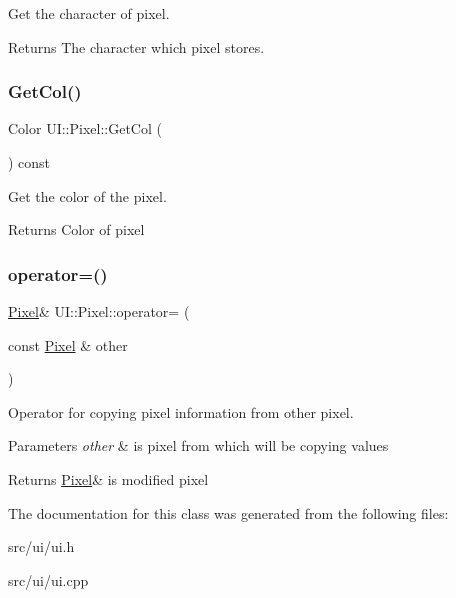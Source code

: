 Get the character of pixel. 

\begin{DoxyReturn}{Returns}
The character which pixel stores. 
\end{DoxyReturn}
\mbox{\label{classUI_1_1Pixel_a0068bdfb2e0a853ec511df3422d17a37}} 
\subsubsection{\texorpdfstring{Get\+Col()}{GetCol()}}
{\footnotesize\ttfamily Color U\+I\+::\+Pixel\+::\+Get\+Col (\begin{DoxyParamCaption}{ }\end{DoxyParamCaption}) const}



Get the color of the pixel. 

\begin{DoxyReturn}{Returns}
Color of pixel 
\end{DoxyReturn}
\mbox{\label{classUI_1_1Pixel_a941e174c6d89806fd52f5f4a99c994f2}} 
\subsubsection{\texorpdfstring{operator=()}{operator=()}}
{\footnotesize\ttfamily \hyperlink{classUI_1_1Pixel}{Pixel}\& U\+I\+::\+Pixel\+::operator= (\begin{DoxyParamCaption}\item[{const \hyperlink{classUI_1_1Pixel}{Pixel} \&}]{other }\end{DoxyParamCaption})\hspace{0.3cm}{\ttfamily [inline]}}



Operator for copying pixel information from other pixel. 


\begin{DoxyParams}{Parameters}
{\em other} & is pixel from which will be copying values \\
\hline
\end{DoxyParams}
\begin{DoxyReturn}{Returns}
\hyperlink{classUI_1_1Pixel}{Pixel}\& is modified pixel 
\end{DoxyReturn}


The documentation for this class was generated from the following files\+:\begin{DoxyCompactItemize}
\item 
src/ui/ui.\+h\item 
src/ui/ui.\+cpp\end{DoxyCompactItemize}
